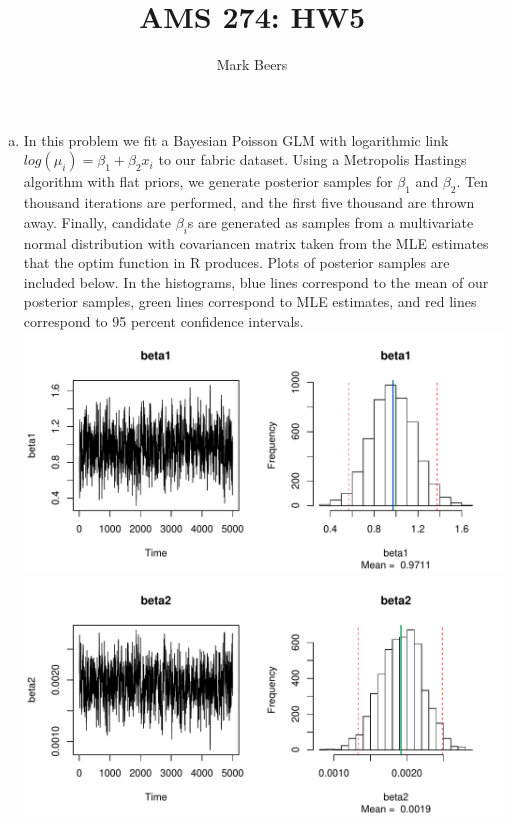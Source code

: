 \documentclass[12pt]{article}
\begin{document}
 
 
 
\title{AMS 274: HW5}%
\author{Mark Beers %
} %
 
\maketitle
 
\begin{enumerate}[(a)]
\item In this problem we fit a Bayesian Poisson GLM with logarithmic link $log(\mu_i) = \beta_1 + \beta_2 x_i$ to our fabric dataset. Using a Metropolis Hastings algorithm with flat priors, we generate posterior samples for $\beta_1$ and $\beta_2$. Ten thousand iterations are performed, and the first five thousand are thrown away. Finally, candidate $\beta_i$s are generated as samples from a multivariate normal distribution with covariancen matrix taken from the MLE estimates that the optim function in R produces. Plots of posterior samples are included below. In the histograms, blue lines correspond to the mean of our posterior samples, green lines correspond to MLE estimates, and red lines correspond to 95 percent confidence intervals. \\
\newline
\includegraphics[scale = .7]{plot1.pdf} \\
\includegraphics[scale = .7]{plot2.pdf} \\

\end{enumerate}
\end{document}
